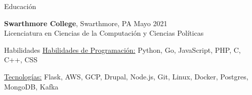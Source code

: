 \documentclass{resume} %
\begin{document}
	
	\begin{rSection}{Educación}
		
		{\bf Swarthmore College}, Swarthmore, PA \hfill {Mayo 2021} \\ 
		Licenciatura en Ciencias de la Computación y Ciencias Políticas
		
	\end{rSection}
	
	
	\begin{rSection}{Habilidades}
		\underline{Habilidades de Programación:} Python, Go, JavaScript, PHP, C, C++, CSS
		
		\underline{Tecnologías:} Flask, AWS, GCP, Drupal, Node.js, Git, Linux, Docker, Postgres, MongoDB, Kafka
	\end{rSection}
	
\end{document}
